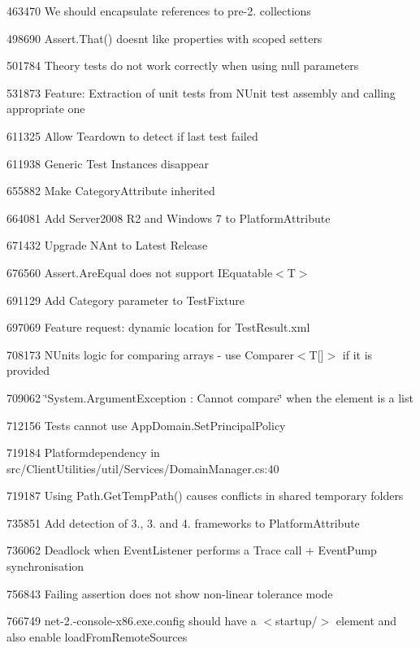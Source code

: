 \begin{DoxyItemize}
\item 463470 We should encapsulate references to pre-\/2. collections
\item 498690 Assert.\+That() doesn\textquotesingle{}t like properties with scoped setters
\item 501784 Theory tests do not work correctly when using null parameters
\item 531873 Feature\+: Extraction of unit tests from N\+Unit test assembly and calling appropriate one
\item 611325 Allow Teardown to detect if last test failed
\item 611938 Generic Test Instances disappear
\item 655882 Make Category\+Attribute inherited
\item 664081 Add Server2008 R2 and Windows 7 to Platform\+Attribute
\item 671432 Upgrade N\+Ant to Latest Release
\item 676560 Assert.\+Are\+Equal does not support {\ttfamily I\+Equatable$<$T$>$}
\item 691129 Add Category parameter to Test\+Fixture
\item 697069 Feature request\+: dynamic location for Test\+Result.\+xml
\item 708173 N\+Unit\textquotesingle{}s logic for comparing arrays -\/ use {\ttfamily Comparer$<$T\mbox{[}\mbox{]}$>$} if it is provided
\item 709062 \char`\"{}\+System.\+Argument\+Exception \+: Cannot compare\char`\"{} when the element is a list
\item 712156 Tests cannot use App\+Domain.\+Set\+Principal\+Policy
\item 719184 Platformdependency in src/\+Client\+Utilities/util/\+Services/\+Domain\+Manager.\+cs\+:40
\item 719187 Using Path.\+Get\+Temp\+Path() causes conflicts in shared temporary folders
\item 735851 Add detection of 3., 3. and 4. frameworks to Platform\+Attribute
\item 736062 Deadlock when Event\+Listener performs a Trace call + Event\+Pump synchronisation
\item 756843 Failing assertion does not show non-\/linear tolerance mode
\item 766749 net-\/2.-\/console-\/x86.\+exe.\+config should have a {\ttfamily $<$startup/$>$} element and also enable load\+From\+Remote\+Sources

\end{DoxyItemize}
